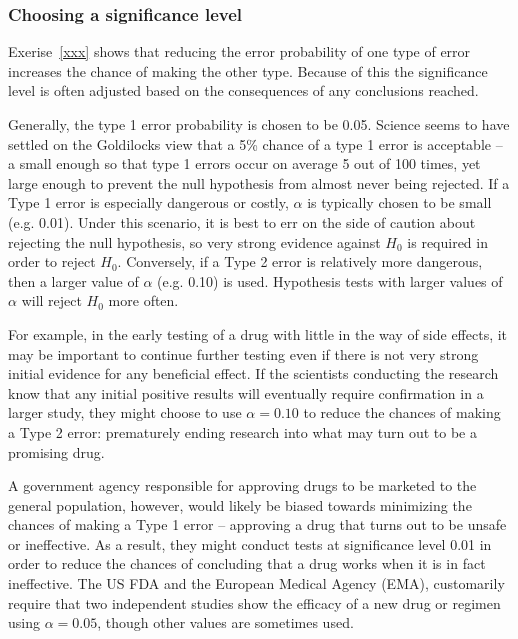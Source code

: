 \begin{spacing}{1.5}

\subsubsection{Choosing a significance level}

Exerise~\ref{xxx} shows that reducing the error probability of one type of error increases the chance of making the other type. Because of this the significance level is often adjusted based on the consequences of any conclusions reached.

\label{significanceLevel}


Generally, the type 1 error probability is chosen to be 0.05.  Science seems to have settled on the Goldilocks view that a 5\% chance of a type 1 error is acceptable  -- a small enough so that type 1 errors occur on average 5 out of 100 times, yet large enough to prevent the null hypothesis from almost never being rejected. If a Type 1 error is especially dangerous or costly,  $\alpha$ is typically chosen to be small (e.g. 0.01). Under this scenario, it is best to err on the side of caution about rejecting the null hypothesis, so very strong evidence against $H_0$ is required in order to reject $H_0$. Conversely, if a Type 2 error is relatively more dangerous, then a larger value of $\alpha$ (e.g. 0.10) is used. Hypothesis tests with larger values of $\alpha$ will reject $H_0$ more often.

For example, in the early testing of a drug with little in the way of side effects, it may be important to continue further testing even if there is not very strong initial evidence for any beneficial effect. If the scientists conducting the research know that any initial positive results will eventually require confirmation in a larger study, they might choose to use $\alpha = 0.10$ to reduce the chances of making a Type 2 error: prematurely ending research into what may turn out to be a promising drug. 

A government agency responsible for approving drugs to be marketed to the general population, however, would likely be biased towards minimizing the chances of making a Type 1 error -- approving a drug that turns out to be unsafe or ineffective. As a result, they might conduct tests at significance level 0.01 in order to reduce the chances of concluding that a drug works when it is in fact ineffective. The US FDA and the European Medical Agency (EMA), customarily require that two independent studies show the efficacy of a new drug or regimen using $\alpha = 0.05$, though other values are sometimes used.



\end{spacing}

